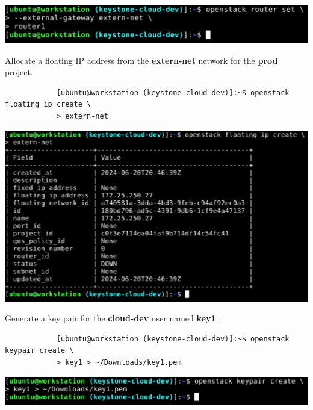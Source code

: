 \documentclass[letterpaper, 12pt]{article}
\begin{document}
\begin{enumerate}
\begin{labstep}
        \begin{center}
            \includegraphics[width=\linewidth]{images/part1/step28.png}
        \end{center}
    \end{labstep}

    \begin{labstep}
        Allocate a floating IP address from the \textbf{extern-net} network for the \textbf{prod} project.
        \begin{lstlisting}
            [ubuntu@workstation (keystone-cloud-dev)]:~$ openstack floating ip create \
            > extern-net
        \end{lstlisting}

        \begin{center}
            \includegraphics[width=\linewidth]{images/part1/step29.png}
        \end{center}
    \end{labstep}

    \begin{labstep}
        Generate a key pair for the \textbf{cloud-dev} user named \textbf{key1}.
        \begin{lstlisting}
            [ubuntu@workstation (keystone-cloud-dev)]:~$ openstack keypair create \
            > key1 > ~/Downloads/key1.pem
        \end{lstlisting}

        \begin{center}
            \includegraphics[width=\linewidth]{images/part1/step30.png}
        \end{center}
    \end{labstep}


\end{enumerate}
\end{document}
